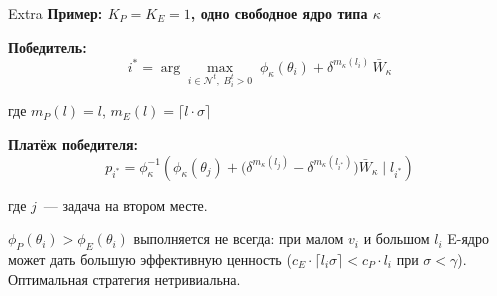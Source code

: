 \documentclass[aspectratio=169]{beamer}
\begin{document}
\begin{frame}{Extra}
        \textbf{Пример: $K_P = K_E = 1$, одно свободное ядро типа $\kappa$}

        \vspace{0.2cm}
        \textbf{Победитель:}
        $$i^* = \arg\max_{i \in \mathcal{N}^t,\; B_i^t > 0}\;
        \phi_\kappa(\theta_i) + \delta^{m_\kappa(l_i)}\,\bar{W}_\kappa$$

        где $m_P(l) = l$,\; $m_E(l) = \lceil l\cdot\sigma \rceil$

        \vspace{0.2cm}
        \textbf{Платёж победителя:}
        $$p_{i^*} = \phi_\kappa^{-1}\!\left(\phi_\kappa(\theta_j) +
                \bigl(\delta^{m_\kappa(l_j)} - \delta^{m_\kappa(l_{i^*})}\bigr)
        \bar{W}_\kappa \;\Big|\; l_{i^*}\right)$$

        где $j$~--- задача на втором месте.

        \vspace{0.2cm}
        \begin{shadowbox}
                \footnotesize
                $\phi_P(\theta_i) > \phi_E(\theta_i)$ выполняется не всегда:
                при малом $v_i$ и большом $l_i$ E-ядро может дать
                большую эффективную ценность ($c_E \cdot \lceil l_i\sigma\rceil
                < c_P \cdot l_i$ при $\sigma < \gamma$).
                Оптимальная стратегия нетривиальна.
        \end{shadowbox}
\end{frame}
\addtocounter{framenumber}{-1}
\end{document}
